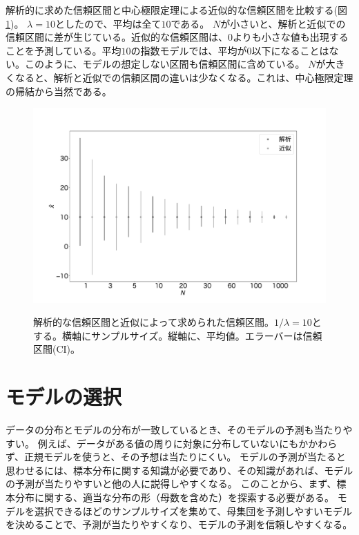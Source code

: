 解析的に求めた信頼区間と中心極限定理による近似的な信頼区間を比較する(図\ref{fig:model_predict_CI_interval})。
$\lambda=10$としたので、平均は全て$10$である。
$N$が小さいと、解析と近似での信頼区間に差が生じている。近似的な信頼区間は、$0$よりも小さな値も出現することを予測している。平均$10$の指数モデルでは、平均が$0$以下になることはない。このように、モデルの想定しない区間も信頼区間に含めている。
$N$が大きくなると、解析と近似での信頼区間の違いは少なくなる。これは、中心極限定理の帰結から当然である。

\begin{figure}
    \begin{center}
        \includegraphics[width=15cm]{./image/12_/confidence_expon_interval.pdf}
        \label{fig:model_predict_CI_interval}
        \caption{解析的な信頼区間と近似によって求められた信頼区間。$1/\lambda=10$とする。横軸にサンプルサイズ。縦軸に、平均値。エラーバーは信頼区間(CI)。}
      \end{center}
    \end{figure}

\section{モデルの選択}
データの分布とモデルの分布が一致しているとき、そのモデルの予測も当たりやすい。
例えば、データがある値の周りに対象に分布していないにもかかわらず、正規モデルを使うと、その予想は当たりにくい。
モデルの予測が当たると思わせるには、標本分布に関する知識が必要であり、その知識があれば、モデルの予測が当たりやすいと他の人に説得しやすくなる。
このことから、まず、標本分布に関する、適当な分布の形（母数を含めた）を探索する必要がある。
モデルを選択できるほどのサンプルサイズを集めて、母集団を予測しやすいモデルを決めることで、予測が当たりやすくなり、モデルの予測を信頼しやすくなる。

